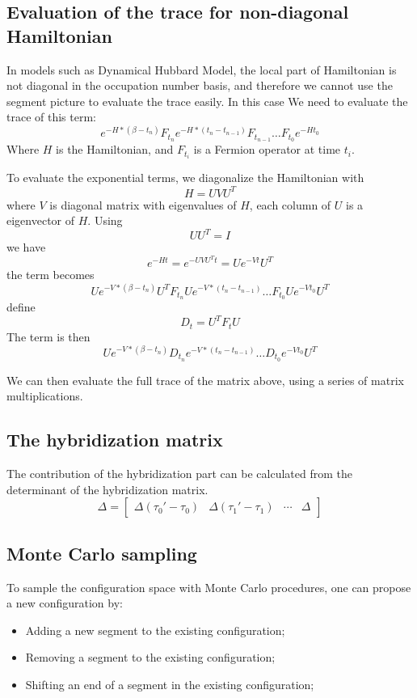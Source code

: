 \subsection{Evaluation of the trace for non-diagonal Hamiltonian}
\label{sec:trace}
In models such as Dynamical Hubbard Model, the local part of Hamiltonian is not
diagonal in the occupation number basis, and therefore we cannot use the segment
picture to evaluate the trace easily. In this case We need to evaluate the 
trace of this term:
\begin{equation}
  \label{eq:1}
  e^{-H*(\beta-t_n)}F_{t_n}e^{-H*(t_n-t_{n-1})}F_{t_{n-1}}\ldots F_{t_0}e^{-Ht_0}  
\end{equation}
Where $H$ is the Hamiltonian, and $F_{t_{i}}$ is a Fermion operator at time $t_i$.

To evaluate the exponential terms, we diagonalize the Hamiltonian with
\[
H=UVU^T
\]
where $V$ is diagonal matrix with eigenvalues of $H$, each column of $U$ is a
eigenvector of $H$.
Using
\[
UU^T=I
\]
we have 
\[
e^{-Ht}=e^{-UVU^Tt}=Ue^{-Vt}U^T
\]
 the term becomes
\[
Ue^{-V*(\beta-t_n)}U^TF_{t_n}Ue^{-V*(t_n-t_{n-1})}\ldots F_{t_0}Ue^{-Vt_0}U^T
\]
define 
\[
D_t=U^TF_tU
\]
The term is then
\begin{equation}
  \label{eq:2}
  Ue^{-V*(\beta-t_n)}D_{t_n}e^{-V*(t_n-t_{n-1})}\ldots D_{t_0}e^{-Vt_0}U^T  
\end{equation}

We can then evaluate the full trace of the matrix above, using a series of 
matrix multiplications.


\subsection{The hybridization matrix}
\label{sec:hyb_matrix}
The contribution of the hybridization part can be calculated from the 
determinant of the hybridization matrix. 
\begin{equation}
  \label{eq:4}
  \Delta=\left[
    \begin{array}{cccc}
      \Delta(\tau_0'-\tau_0)& \Delta(\tau_1'-\tau_1) & \cdots& \Delta
    \end{array}


  \right]
\end{equation}

\subsection{Monte Carlo sampling}
\label{sec:cthyb_mcs}
To sample the configuration space with Monte Carlo procedures, one can propose 
a new configuration by:
\begin{itemize}
\item Adding a new segment to the existing configuration;
\item Removing a segment to the existing configuration;
\item Shifting an end of a segment in the existing configuration;
\end{itemize}


